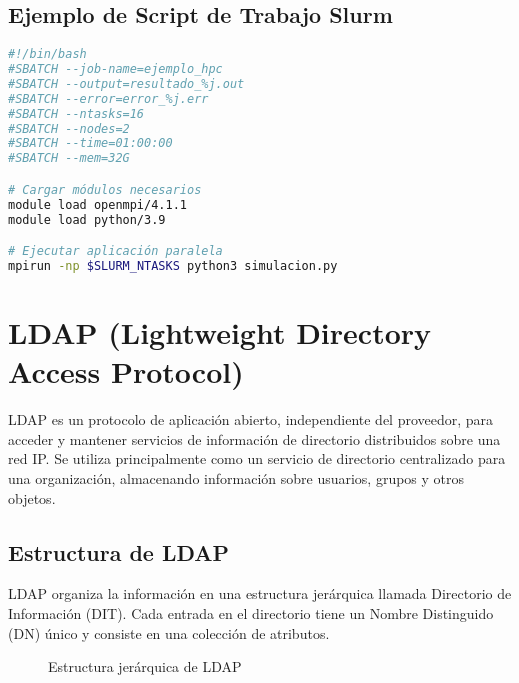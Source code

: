 \documentclass[12pt,a4paper]{report}
\begin{document}
\subsection{Ejemplo de Script de Trabajo Slurm}

\begin{lstlisting}[language=bash]
#!/bin/bash
#SBATCH --job-name=ejemplo_hpc
#SBATCH --output=resultado_%j.out
#SBATCH --error=error_%j.err
#SBATCH --ntasks=16
#SBATCH --nodes=2
#SBATCH --time=01:00:00
#SBATCH --mem=32G

# Cargar módulos necesarios
module load openmpi/4.1.1
module load python/3.9

# Ejecutar aplicación paralela
mpirun -np $SLURM_NTASKS python3 simulacion.py
\end{lstlisting}

\section{LDAP (Lightweight Directory Access Protocol)}

\begin{tcolorbox}[
  colback=cientigo-blue!5,
  colframe=cientigo-blue,
  arc=2mm,
  boxrule=0.5pt,
  title=\textbf{LDAP},
  fonttitle=\bfseries\color{white},
  coltitle=cientigo-blue,
  attach boxed title to top center={yshift=-2mm},
  boxed title style={colback=cientigo-blue}
]
LDAP es un protocolo de aplicación abierto, independiente del proveedor, para acceder y mantener servicios de información de directorio distribuidos sobre una red IP. Se utiliza principalmente como un servicio de directorio centralizado para una organización, almacenando información sobre usuarios, grupos y otros objetos.
\end{tcolorbox}

\subsection{Estructura de LDAP}

LDAP organiza la información en una estructura jerárquica llamada Directorio de Información (DIT). Cada entrada en el directorio tiene un Nombre Distinguido (DN) único y consiste en una colección de atributos.

\begin{figure}[H]
\centering
{}
\caption{Estructura jerárquica de LDAP}
\label{fig:ldap_structure}
\end{figure}
\end{document}
